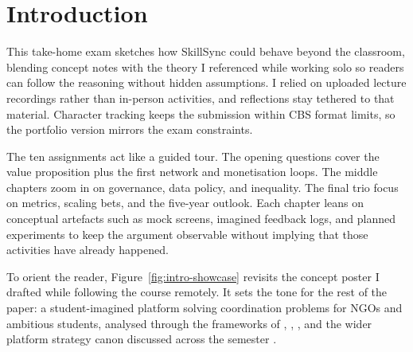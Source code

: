 \documentclass[12pt,a4paper]{article}
\begin{document}
\tableofcontents
\newpage

\section*{Introduction}
This take-home exam sketches how SkillSync could behave beyond the classroom, blending concept notes with the theory I referenced while working solo so readers can follow the reasoning without hidden assumptions. I relied on uploaded lecture recordings rather than in-person activities, and reflections stay tethered to that material. Character tracking keeps the submission within CBS format limits, so the portfolio version mirrors the exam constraints.

The ten assignments act like a guided tour. The opening questions cover the value proposition plus the first network and monetisation loops. The middle chapters zoom in on governance, data policy, and inequality. The final trio focus on metrics, scaling bets, and the five-year outlook. Each chapter leans on conceptual artefacts such as mock screens, imagined feedback logs, and planned experiments to keep the argument observable without implying that those activities have already happened.

To orient the reader, Figure~\ref{fig:intro-showcase} revisits the concept poster I drafted while following the course remotely. It sets the tone for the rest of the paper: a student-imagined platform solving coordination problems for NGOs and ambitious students, analysed through the frameworks of \citet{Choudary2016}, \citet{Srnicek2017}, \citet{Reillier2017}, and the wider platform strategy canon discussed across the semester \citep{Lecture01,Lecture03,Lecture05}.
\end{document}
